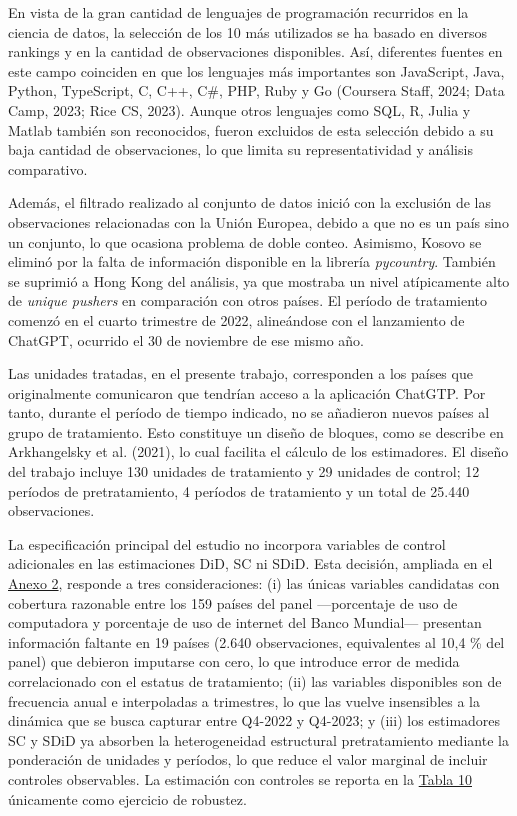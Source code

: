 \documentclass[12pt,a4paper]{article}
\begin{document}
En vista de la gran cantidad de lenguajes de programación recurridos en la ciencia de datos, la selección de los 10 más utilizados se ha basado en diversos rankings y en la cantidad de observaciones disponibles. Así, diferentes fuentes en este campo coinciden en que los lenguajes más importantes son JavaScript, Java, Python, TypeScript, C, C++, C\#, PHP, Ruby y Go (Coursera Staff, 2024; Data Camp, 2023; Rice CS, 2023). Aunque otros lenguajes como SQL, R, Julia y Matlab también son reconocidos, fueron excluidos de esta selección debido a su baja cantidad de observaciones, lo que limita su representatividad y análisis comparativo.

Además, el filtrado realizado al conjunto de datos inició con la exclusión de las observaciones relacionadas con la Unión Europea, debido a que no es un país sino un conjunto, lo que ocasiona problema de doble conteo. Asimismo, Kosovo se eliminó por la falta de información disponible en la librería \textit{pycountry}. También se suprimió a Hong Kong del análisis, ya que mostraba un nivel atípicamente alto de \textit{unique pushers} en comparación con otros países. El período de tratamiento comenzó en el cuarto trimestre de 2022, alineándose con el lanzamiento de ChatGPT, ocurrido el 30 de noviembre de ese mismo año.

Las unidades tratadas, en el presente trabajo, corresponden a los países que originalmente comunicaron que tendrían acceso a la aplicación ChatGTP. Por tanto, durante el período de tiempo indicado, no se añadieron nuevos países al grupo de tratamiento. Esto constituye un diseño de bloques, como se describe en Arkhangelsky et al. (2021), lo cual facilita el cálculo de los estimadores. El diseño del trabajo incluye 130 unidades de tratamiento y 29 unidades de control; 12 períodos de pretratamiento, 4 períodos de tratamiento y un total de 25.440 observaciones.

La especificación principal del estudio no incorpora variables de control adicionales en las estimaciones DiD, SC ni SDiD. Esta decisión, ampliada en el \hyperref[anexo:2]{Anexo 2}, responde a tres consideraciones: (i) las únicas variables candidatas con cobertura razonable entre los 159 países del panel —porcentaje de uso de computadora y porcentaje de uso de internet del Banco Mundial— presentan información faltante en 19 países (2.640 observaciones, equivalentes al 10,4 \% del panel) que debieron imputarse con cero, lo que introduce error de medida correlacionado con el estatus de tratamiento; (ii) las variables disponibles son de frecuencia anual e interpoladas a trimestres, lo que las vuelve insensibles a la dinámica que se busca capturar entre Q4-2022 y Q4-2023; y (iii) los estimadores SC y SDiD ya absorben la heterogeneidad estructural pretratamiento mediante la ponderación de unidades y períodos, lo que reduce el valor marginal de incluir controles observables. La estimación con controles se reporta en la \hyperref[tab:tabla4]{Tabla 10} únicamente como ejercicio de robustez.
\end{document}
